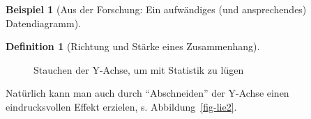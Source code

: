 \documentclass[
  a4paper,
]{scrbook}
\theoremstyle{definition}
\newtheorem{example}{Beispiel}[chapter]
\theoremstyle{definition}
\newtheorem{definition}{Definition}[chapter]
\theoremstyle{definition}
\theoremstyle{remark}
\begin{document}
\begin{example}[Aus der Forschung: Ein aufwändiges (und ansprechendes)
Datendiagramm]
\begin{definition}[Richtung und Stärke eines
Zusammenhang]
\begin{figure}
\begin{minipage}{0.50\linewidth}
{}


\end{minipage}%
%
\begin{minipage}{0.50\linewidth}



\end{minipage}%

\caption{\label{fig-lie1}Stauchen der Y-Achse, um mit Statistik zu
lügen}

\end{figure}%

Natürlich kann man auch durch ``Abschneiden'' der Y-Achse einen
eindrucksvollen Effekt erzielen, s. Abbildung~\ref{fig-lie2}.

\begin{figure}

\begin{minipage}{0.50\linewidth}

\end{minipage}
\end{figure}
\end{definition}
\end{example}
\end{document}
